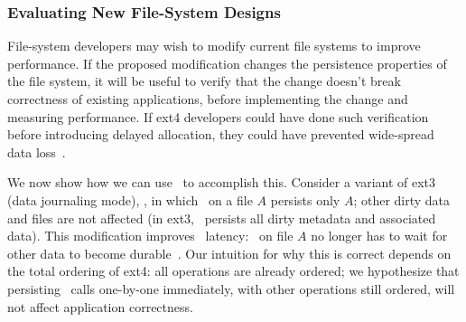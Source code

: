 \subsubsection{Evaluating New File-System Designs}
\label{sec-twojournal}

%
%
%
%
%


File-system developers may wish to modify current file systems to improve
performance. If the proposed modification changes the persistence properties of
the file system, it will be useful to verify that the change doesn't break
correctness of existing applications, before implementing the change and
measuring performance. If ext4 developers could have done such verification
before introducing delayed allocation, they could have prevented wide-spread
data loss~\cite{URLmassivefsthread}.

We now show how we can use \toolname\ to accomplish this. Consider a variant of
ext3 (data journaling mode), , in which \fsyncSC\ on a file $A$
persists only $A$; other dirty data and files are not affected (in ext3,
\fsyncSC\ persists all dirty metadata and associated data). This modification
improves \fsyncSC\ latency: \fsyncSC\ on file $A$ no longer has to wait for
other data to become durable~\cite{LWN1}. Our intuition for why this is correct
depends on the total ordering of ext4: all operations are already ordered; we
hypothesize that persisting \fsyncSC\ calls one-by-one immediately, with other
operations still ordered, will not affect application correctness. 

